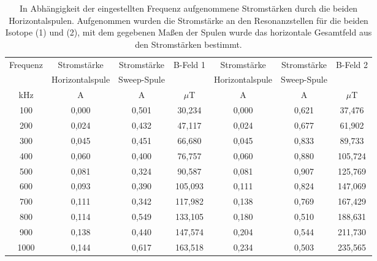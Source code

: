 \begin{table}
  \centering
  \caption{In Abhängigkeit der eingestellten Frequenz aufgenommene Stromstärken durch die beiden Horizontalspulen. Aufgenommen wurden die Stromstärke an den Resonanzstellen für die beiden Isotope (1) und (2), mit dem gegebenen Maßen der Spulen wurde das horizontale Gesamtfeld aus den Stromstärken bestimmt.}
  \label{tab.Tab1}
    \begin{tabular}{c c c c c c c}
      \toprule
      Frequenz  & Stromstärke & Stromstärke & B-Feld 1 & Stromstärke & Stromstärke &  B-Feld 2\\
        & Horizontalspule & Sweep-Spule & & Horizontalspule & Sweep-Spule&\\
      kHz & A& A& $\mu$T & A& A& $\mu$T\\
      \midrule
      \midrule
      100     & 0,000  &  0,501 &  30,234  &  0,000 &  0,621 &  37,476 \\
      200     & 0,024  &  0,432 &  47,117  &  0,024 &  0,677 &  61,902 \\
      300     & 0,045  &  0,451 &  66,680  &  0,045 &  0,833 &  89,733 \\
      400     & 0,060  &  0,400 &  76,757  &  0,060 &  0,880 & 105,724 \\
      500     & 0,081  &  0,324 &  90,587  &  0,081 &  0,907 & 125,769 \\
      600     & 0,093  &  0,390 & 105,093  &  0,111 &  0,824 & 147,069 \\
      700     & 0,111  &  0,342 & 117,982  &  0,138 &  0,769 & 167,429 \\
      800     & 0,114  &  0,549 & 133,105  &  0,180 &  0,510 & 188,631 \\
      900     & 0,138  &  0,440 & 147,574  &  0,204 &  0,544 & 211,730 \\
      1000    & 0,144  &  0,617 & 163,518  &  0,234 &  0,503 & 235,565 \\
      \bottomrule
    \end{tabular}
\end{table}
